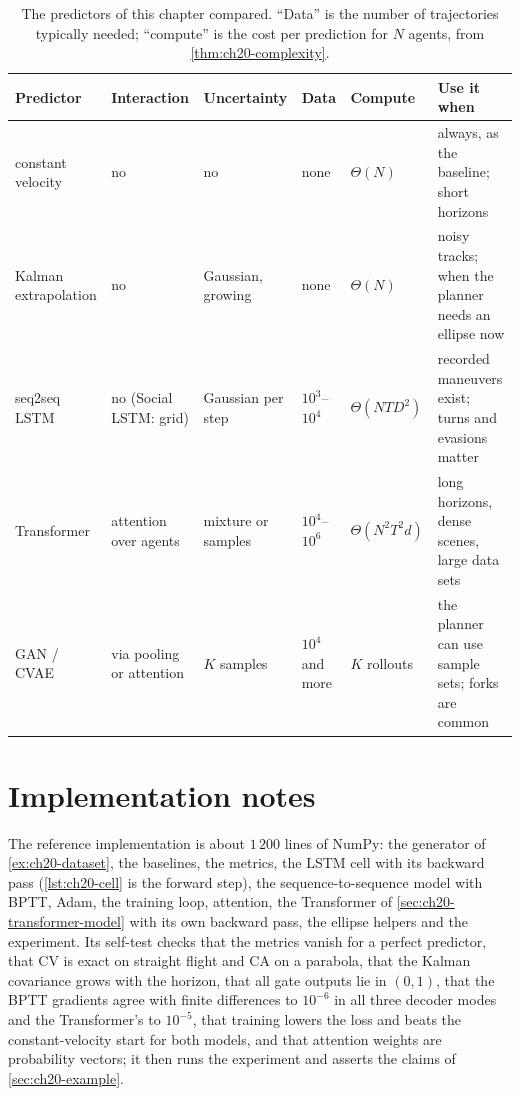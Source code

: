 \begin{table}[tb]
  \centering\small
  \caption{The predictors of this chapter compared. ``Data'' is the number of
  trajectories typically needed; ``compute'' is the cost per prediction for
  $N$ agents, from \cref{thm:ch20-complexity}.}
  \label{tab:ch20-methods}
  \footnotesize
  \begin{tabularx}{\textwidth}{@{}L{2.5cm}L{2.4cm}L{2.0cm}L{1.6cm}L{1.9cm}Y@{}}
  \toprule
  Predictor & Interaction & Uncertainty & Data & Compute & Use it when\\
  \midrule
  constant velocity & no & no & none & $\Theta(N)$ & always, as the baseline; short horizons\\
  Kalman extrapolation & no & Gaussian, growing & none & $\Theta(N)$ & noisy tracks; when the planner needs an ellipse now\\
  seq2seq LSTM & no (Social LSTM: grid) & Gaussian per step & $10^3$--$10^4$ & $\Theta(N T D^2)$ & recorded maneuvers exist; turns and evasions matter\\
  Transformer & attention over agents & mixture or samples & $10^4$--$10^6$ & $\Theta(N^2 T^2 d)$ & long horizons, dense scenes, large data sets\\
  GAN / CVAE & via pooling or attention & $K$ samples & $10^4$ and more & $K$ rollouts & the planner can use sample sets; forks are common\\
  \bottomrule
  \end{tabularx}
\end{table}

\section{Implementation notes}
\label{sec:ch20-implementation}

The reference implementation  is about $1\,200$
lines of NumPy: the generator of \cref{ex:ch20-dataset}, the baselines, the
metrics, the LSTM cell with its backward pass (\cref{lst:ch20-cell} is the
forward step), the sequence-to-sequence model with BPTT, Adam, the training
loop, attention, the Transformer of \cref{sec:ch20-transformer-model} with
its own backward pass, the ellipse helpers and the experiment. Its self-test checks that the metrics vanish for a perfect
predictor, that CV is exact on straight flight and CA on a parabola, that
the Kalman covariance grows with the horizon, that all gate outputs lie in
$(0, 1)$, that the BPTT gradients agree with finite differences to $10^{-6}$
in all three decoder modes and the Transformer's to $10^{-5}$, that training
lowers the loss and beats the constant-velocity start for both models, and
that attention weights are probability vectors;
it then runs the experiment and asserts the claims of \cref{sec:ch20-example}.

